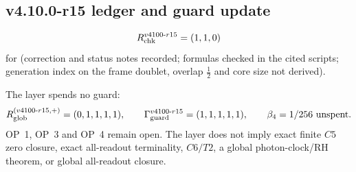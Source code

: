 \subsection*{v4.10.0-r15 ledger and guard update}
\label{subsec:v4100-r15-ledger-guard}

\[
R_{\rm chk}^{v4100\text{-}r15}=(1,1,0)
\]
for (correction and status notes recorded; formulas checked in the cited scripts; generation index on the frame doublet,
overlap \(\tfrac12\) and core size not derived).

The layer spends no guard:
\[
R_{\rm glob}^{(v4100\text{-}r15,+)}=(0,1,1,1,1),
\qquad
\Gamma_{\rm guard}^{v4100\text{-}r15}=(1,1,1,1,1),
\qquad
\beta_4=1/256\ \text{unspent}.
\]
OP~1, OP~3 and OP~4 remain open.  The layer does not imply exact finite \(C5\) zero closure, exact all-readout terminality,
\(C6/T2\), a global photon-clock/RH theorem, or global all-readout closure.
